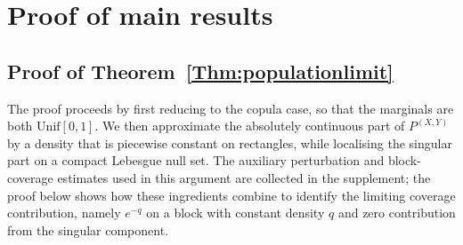 \documentclass[11pt]{article}
\begin{document}

\appendix
\section{Proof of main results}\label{sec:proof_main}

\subsection{Proof of Theorem~\ref{Thm:populationlimit}}
The proof proceeds by first reducing to the copula case, so that the marginals are both $\mathrm{Unif}[0,1]$. We then approximate the absolutely continuous part of $P^{(X,Y)}$ by a density that is piecewise constant on rectangles, while localising the singular part on a compact Lebesgue null set. The auxiliary perturbation and block-coverage estimates used in this argument are collected in the supplement; the proof below shows how these ingredients combine to identify the limiting coverage contribution, namely $e^{-q}$ on a block with constant density $q$ and zero contribution from the singular component.
\end{document}
